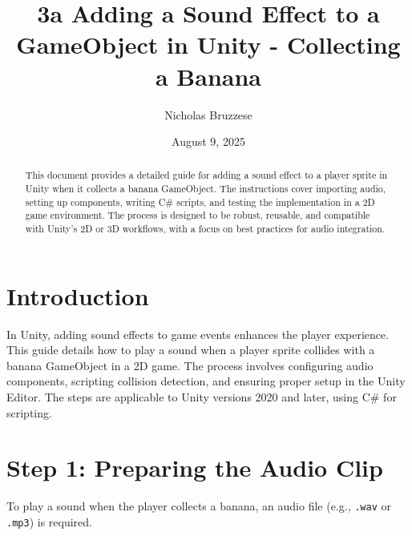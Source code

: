 \documentclass[a4paper,12pt]{article}
\begin{document}
	
	\title{3a Adding a Sound Effect to a GameObject in Unity - Collecting a Banana}
	\author{Nicholas Bruzzese}
	\date{August 9, 2025}
	\maketitle
	
	\begin{abstract}
		This document provides a detailed guide for adding a sound effect to a player sprite in Unity when it collects a banana GameObject. The instructions cover importing audio, setting up components, writing C\# scripts, and testing the implementation in a 2D game environment. The process is designed to be robust, reusable, and compatible with Unity's 2D or 3D workflows, with a focus on best practices for audio integration.
	\end{abstract}
	
	\section{Introduction}
	In Unity, adding sound effects to game events enhances the player experience. This guide details how to play a sound when a player sprite collides with a banana GameObject in a 2D game. The process involves configuring audio components, scripting collision detection, and ensuring proper setup in the Unity Editor. The steps are applicable to Unity versions 2020 and later, using C\# for scripting.
	
	\section{Step 1: Preparing the Audio Clip}
	To play a sound when the player collects a banana, an audio file (e.g., \texttt{.wav} or \texttt{.mp3}) is required.
	
\end{document}
